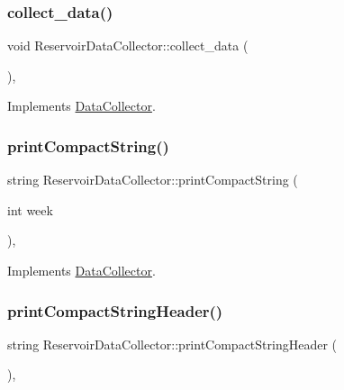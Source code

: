 \subsubsection{\texorpdfstring{collect\+\_\+data()}{collect\_data()}}
{\footnotesize\ttfamily void Reservoir\+Data\+Collector\+::collect\+\_\+data (\begin{DoxyParamCaption}{ }\end{DoxyParamCaption})\hspace{0.3cm}{\ttfamily [override]}, {\ttfamily [virtual]}}



Implements \mbox{\hyperlink{classDataCollector_a01486bf58acbe37b203f97b3b9a79c40}{Data\+Collector}}.

\mbox{\label{classReservoirDataCollector_a0b68d7fa4a6d704350340d1ac3e8a1d2}} 
\subsubsection{\texorpdfstring{print\+Compact\+String()}{printCompactString()}}
{\footnotesize\ttfamily string Reservoir\+Data\+Collector\+::print\+Compact\+String (\begin{DoxyParamCaption}\item[{int}]{week }\end{DoxyParamCaption})\hspace{0.3cm}{\ttfamily [override]}, {\ttfamily [virtual]}}



Implements \mbox{\hyperlink{classDataCollector_a2eac264fa5612aed5a830b12de4f4ae3}{Data\+Collector}}.

\mbox{\label{classReservoirDataCollector_aa8346433f037bbca41f3c8450f7f88cf}} 
\subsubsection{\texorpdfstring{print\+Compact\+String\+Header()}{printCompactStringHeader()}}
{\footnotesize\ttfamily string Reservoir\+Data\+Collector\+::print\+Compact\+String\+Header (\begin{DoxyParamCaption}{ }\end{DoxyParamCaption})\hspace{0.3cm}{\ttfamily [override]}, {\ttfamily [virtual]}}



